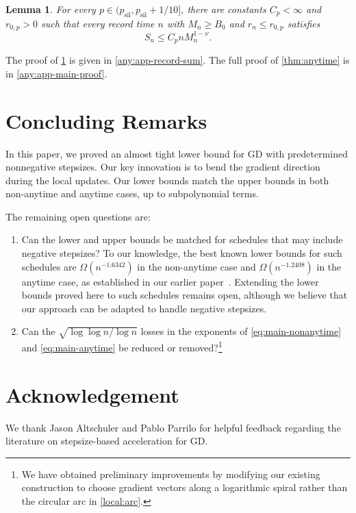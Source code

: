 \documentclass[11pt,letterpaper]{article}
\newtheorem{lemma}[lemma]{Lemma}
\theoremstyle{definition}
\newcommand{\psil}{p_{\mathrm{sil}}}
\begin{document}
\begin{lemma}
\label{any:lem:record-sum}
For every $p\in(\psil,\psil+1/10]$, there are constants $C_p<\infty$ and $r_{0,p}>0$ such that every record time $n$ with $M_n\ge B_0$ and $r_n\le r_{0,p}$ satisfies
\begin{equation}
    S_n\le C_p nM_n^{1-\nu}.
    \label{any:eq:record-sum}
\end{equation}
\end{lemma}

The proof of \cref{any:lem:record-sum} is given in \cref{any:app-record-sum}. The full proof of \cref{thm:anytime} is in \cref{any:app-main-proof}.

\section{Concluding Remarks}
\label{sec:conclusion}

In this paper, we proved an almost tight lower bound for GD with predetermined nonnegative stepsizes.
Our key innovation is to bend the gradient direction during the local updates. 
Our lower bounds match the upper bounds in both non-anytime and anytime cases, up to subpolynomial terms.

The remaining open questions are:

\begin{enumerate}
\item Can the lower and upper bounds be matched for schedules that may include negative stepsizes?
To our knowledge, the best known lower bounds for such schedules are $\Omega(n^{-1.6342})$ in the non-anytime case and $\Omega(n^{-1.2408})$ in the anytime case, as established in our earlier paper~\citep{YeLiu2026}.
Extending the lower bounds proved here to such schedules remains open, although we believe that our approach can be adapted to handle negative stepsizes.

\item Can the $\sqrt{\log\log n/\log n}$ losses in the exponents of \eqref{eq:main-nonanytime} and \eqref{eq:main-anytime} be reduced or removed?\footnote{We have obtained preliminary improvements by modifying our existing construction to choose gradient vectors along a logarithmic spiral rather than the circular arc in \eqref{local:arc}.}
\end{enumerate}

\section*{Acknowledgement}
We thank Jason Altschuler and Pablo Parrilo for helpful feedback regarding the literature on stepsize-based acceleration for GD.
\end{document}
